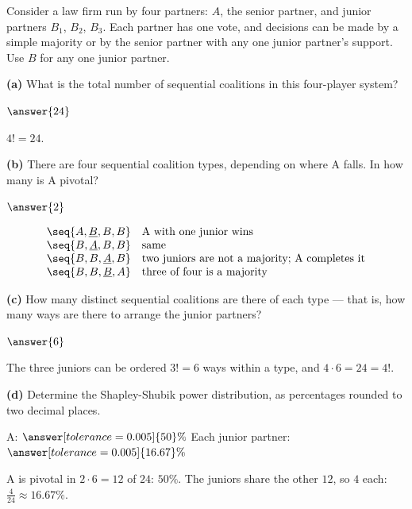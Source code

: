 \documentclass[12pt]{ximera}
\begin{document}
\begin{problem}
Consider a law firm run by four partners: $A$, the senior partner, and junior partners
$B_1$, $B_2$, $B_3$. Each partner has one vote, and decisions can be made by a simple
majority or by the senior partner with any one junior partner's support. Use $B$ for
any one junior partner.

\begin{prompt}
\textbf{(a)} What is the total number of sequential coalitions in this four-player
system?

$\answer{24}$

\begin{feedback}
$4!=24$.
\end{feedback}
\end{prompt}

\begin{prompt}
\textbf{(b)} There are four sequential coalition types, depending on where A falls. In
how many is A pivotal?

$\answer{2}$

\begin{feedback}
\[
\begin{array}{ll}
\seq{A,\underline{B},B,B} & \text{A with one junior wins}\\
\seq{B,\underline{A},B,B} & \text{same}\\
\seq{B,B,\underline{A},B} & \text{two juniors are not a majority; A completes it}\\
\seq{B,B,\underline{B},A} & \text{three of four is a majority}
\end{array}
\]
\end{feedback}
\end{prompt}

\begin{prompt}
\textbf{(c)} How many distinct sequential coalitions are there of each type --- that is,
how many ways are there to arrange the junior partners?

$\answer{6}$

\begin{feedback}
The three juniors can be ordered $3!=6$ ways within a type, and $4\cdot 6=24=4!$.
\end{feedback}
\end{prompt}

\begin{prompt}
\textbf{(d)} Determine the Shapley-Shubik power distribution, as percentages rounded to
two decimal places.

A: $\answer[tolerance=0.005]{50}\%$ \quad Each junior partner:
$\answer[tolerance=0.005]{16.67}\%$

\begin{feedback}
A is pivotal in $2\cdot 6=12$ of $24$: $50\%$. The juniors share the other $12$, so $4$
each: $\frac{4}{24}\approx 16.67\%$.
\end{feedback}
\end{prompt}
\end{problem}
\end{document}
